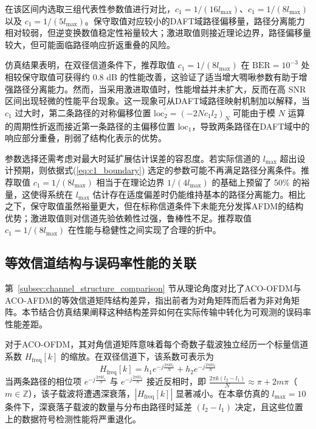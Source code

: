 在该区间内选取三组代表性参数值进行对比，$c_1 = 1/(16l_{\max})$、$c_1 = 1/(8l_{\max})$以及 $c_1 = 1/(5l_{\max})$。保守取值对应较小的DAFT域路径偏移量，路径分离能力相对较弱，但逆变换数值稳定性裕量较大；激进取值则接近理论边界，路径偏移量较大，但可能面临路径响应折返重叠的风险。

仿真结果表明，在双径信道条件下，推荐取值 $c_1 = 1/(8l_{\max})$ 在 $\mathrm{BER}=10^{-3}$ 处相较保守取值可获得约 0.8 dB 的性能改善，这验证了适当增大啁啾参数有助于增强路径分离能力。然而，当采用激进取值时，性能增益并未扩大，反而在高 SNR 区间出现轻微的性能平台现象。这一现象可从DAFT域路径映射机制加以解释，当 $c_1$ 过大时，第二条路径的对称偏移位置 $\mathrm{loc}_2^{\prime} = (-2Nc_1 l_2)_N$ 可能由于模 $N$ 运算的周期性折返而接近第一条路径的主偏移位置 $\mathrm{loc}_1$，导致两条路径在DAFT域中的响应部分重叠，削弱了结构化表示的优势。

参数选择还需考虑对最大时延扩展估计误差的容忍度。若实际信道的 $l_{\max}$ 超出设计预期，则依据式(\ref{eq:c1_boundary}) 选定的参数可能不再满足路径分离条件。推荐取值 $c_1 = 1/(8l_{\max})$ 相当于在理论边界 $1/(4l_{\max})$ 的基础上预留了 50\% 的裕量，这使得系统在 $l_{\max}$ 估计存在适度偏差时仍能维持基本的路径分离能力。相比之下，保守取值虽然裕量更大，但在标称信道条件下未能充分发挥AFDM的结构优势；激进取值则对信道先验依赖性过强，鲁棒性不足。推荐取值 $c_1 = 1/(8l_{\max})$ 在性能与稳健性之间实现了合理的折中。

\subsection{等效信道结构与误码率性能的关联}
\label{subsec:channel_structure_ber_relation}

第~\ref{subsec:channel_structure_comparison} 节从理论角度对比了ACO-OFDM与ACO-AFDM的等效信道矩阵结构差异，指出前者为对角矩阵而后者为非对角矩阵。本节结合仿真结果阐释这种结构差异如何在实际传输中转化为可观测的误码率性能差距。

对于ACO-OFDM，其对角信道矩阵意味着每个奇数子载波独立经历一个标量信道系数 $H_{\mathrm{freq}}[k]$ 的缩放。在双径信道下，该系数可表示为
\begin{equation}
H_{\mathrm{freq}}[k] = h_1 e^{-j\frac{2\pi k l_1}{N}} + h_2 e^{-j\frac{2\pi k l_2}{N}}
\end{equation}
当两条路径的相位项 $e^{-j\frac{2\pi k l_1}{N}}$ 与 $e^{-j\frac{2\pi k l_2}{N}}$ 接近反相时，即 $\frac{2\pi k (l_2-l_1)}{N} \approx \pi + 2m\pi$（$m \in \mathbb{Z}$），该子载波将遭遇深衰落，$|H_{\mathrm{freq}}[k]|$ 显著减小。在本章仿真的 $l_{\max}=10$ 条件下，深衰落子载波的数量与分布由路径时延差 $(l_2-l_1)$ 决定，且这些位置上的数据符号检测性能将严重退化。

